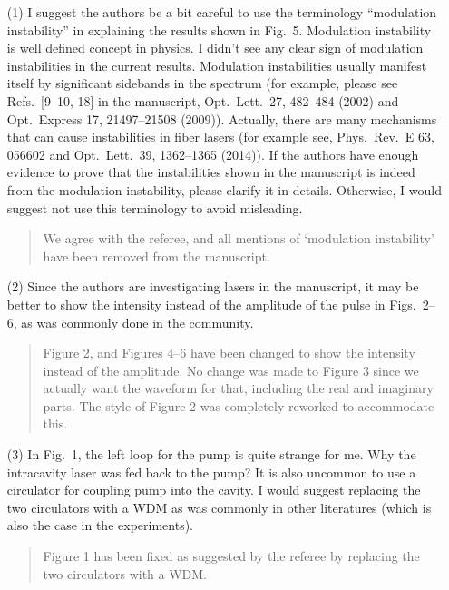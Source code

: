 \documentclass[12pt,twoside,letterpaper]{article}
\begin{document}
\begin{itemize}
    \item[{(1)}]
    I suggest the authors be a bit careful to use the terminology ``modulation instability'' in explaining the results shown in Fig.~5. Modulation instability is well defined concept in physics. I didn't see any clear sign of modulation instabilities in the current results. Modulation instabilities usually manifest itself by significant sidebands in the spectrum (for example, please see Refs.~[9--10, 18] in the manuscript, Opt.~Lett.~27, 482--484 (2002) and Opt.~Express 17, 21497--21508 (2009)). Actually, there are many mechanisms that can cause instabilities in fiber lasers (for example see, Phys.~Rev.~E 63, 056602 and Opt.~Lett.~39, 1362--1365 (2014)). If the authors have enough evidence to prove that the instabilities shown in the manuscript is indeed from the modulation instability, please clarify it in details. Otherwise, I would suggest not use this terminology to avoid misleading.

    \begin{quote}
        We agree with the referee, and all mentions of `modulation instability' have been removed from the manuscript.
    \end{quote}

    \item[{(2)}]
    Since the authors are investigating lasers in the manuscript, it may be better to show the intensity instead of the amplitude of the pulse in Figs.~2--6, as was commonly done in the community.

    \begin{quote}
        Figure 2, and Figures 4--6 have been changed to show the intensity instead of the amplitude. No change was made to Figure 3 since we actually want the waveform for that, including the real and imaginary parts. The style of Figure 2 was completely reworked to accommodate this.
    \end{quote}

    \item[{(3)}]
    In Fig.~1, the left loop for the pump is quite strange for me. Why the intracavity laser was fed back to the pump? It is also uncommon to use a circulator for coupling pump into the cavity. I would suggest replacing the two circulators with a WDM as was commonly in other literatures (which is also the case in the experiments).

    \begin{quote}
        Figure 1 has been fixed as suggested by the referee by replacing the two circulators with a WDM. 
    \end{quote}


\end{itemize}
\end{document}
